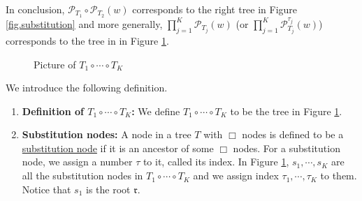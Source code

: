 In conclusion, $\mathcal{P}_{T_1}\circ \mathcal{P}_{T_2}(w)$ corresponds to the right tree in Figure \ref{fig.substitution} and more generally, $\prod_{j=1}^K\mathcal{P}_{T_j}(w)$ (or $\prod_{j=1}^K\mathcal{P}^{\tau_j}_{T_j}(w)$) corresponds to the tree in in Figure \ref{fig.productformula}.

\begin{figure}[H]
    \centering
        \caption{Picture of $T_1\circ \cdots \circ T_{K}$}
        \label{fig.productformula}
    \end{figure}

We introduce the following definition.

\begin{defn}
\begin{enumerate}
    \item \textbf{Definition of $T_1\circ \cdots \circ T_{K}$:} We define  $T_1\circ \cdots \circ T_{K}$ to be the tree in Figure \ref{fig.productformula}.
    \item \textbf{Substitution nodes:} A node in a tree $T$ with $\Box$ nodes is defined to be a \underline{substitution node} if it is an ancestor of some $\Box$ nodes. For a substitution node, we assign a number $\tau$ to it, called its index. In Figure \ref{fig.productformula}, $s_1,\cdots,s_{K}$ are all the substitution nodes in $T_1\circ \cdots \circ T_{K}$ and we assign index $\tau_1,\cdots,\tau_{K}$ to them. Notice that $s_1$ is the root $\mathfrak{r}$.
\end{enumerate}
\end{defn}

